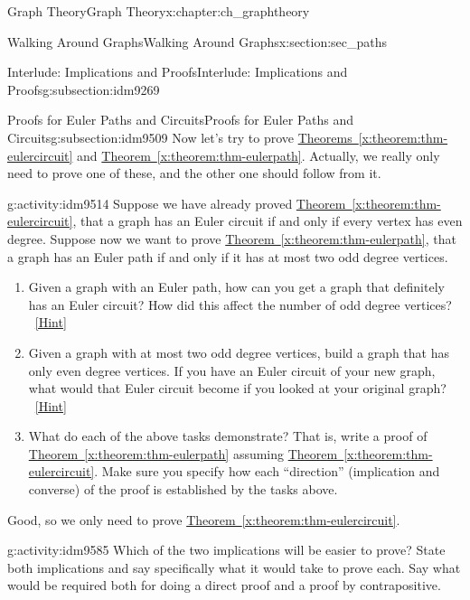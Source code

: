 \documentclass[oneside,10pt,]{book}
\numberwithin{equation}{chapter}
\begin{document}
\begin{chapterptx}{Graph Theory}{}{Graph Theory}{}{}{x:chapter:ch_graphtheory}
\begin{sectionptx}{Walking Around Graphs}{}{Walking Around Graphs}{}{}{x:section:sec_paths}
\begin{subsectionptx}{Interlude: Implications and Proofs}{}{Interlude: Implications and Proofs}{}{}{g:subsection:idm9269}
\end{subsectionptx}
%
%
\typeout{************************************************}
\typeout{************************************************}
%
\begin{subsectionptx}{Proofs for Euler Paths and Circuits}{}{Proofs for Euler Paths and Circuits}{}{}{g:subsection:idm9509}
Now let's try to prove \hyperref[x:theorem:thm-eulercircuit]{Theorems~\ref{x:theorem:thm-eulercircuit}} and \hyperref[x:theorem:thm-eulerpath]{Theorem~\ref{x:theorem:thm-eulerpath}}.  Actually, we really only need to prove one of these, and the other one should follow from it.%
\begin{activity}{}{g:activity:idm9514}%
Suppose we have already proved \hyperref[x:theorem:thm-eulercircuit]{Theorem~\ref{x:theorem:thm-eulercircuit}}, that a graph has an Euler circuit if and only if every vertex has even degree.  Suppose now we want to prove \hyperref[x:theorem:thm-eulerpath]{Theorem~\ref{x:theorem:thm-eulerpath}}, that a graph has an Euler path if and only if it has at most two odd degree vertices.%
\begin{enumerate}[font=\bfseries,label=(\alph*),ref=\alph*]
\item{}Given a graph with an Euler path, how can you get a graph that definitely has an Euler circuit?  How did this affect the number of odd degree vertices?%
\qquad~\hfill{\tiny\hyperlink{g:hint:idm9522-back}{[Hint]}}\item{}Given a graph with at most two odd degree vertices, build a graph that has only even degree vertices.  If you have an Euler circuit of your new graph, what would that Euler circuit become if you looked at your original graph?%
\qquad~\hfill{\tiny\hyperlink{g:hint:idm9546-back}{[Hint]}}\item{}What do each of the above tasks demonstrate?  That is, write a proof of \hyperref[x:theorem:thm-eulerpath]{Theorem~\ref{x:theorem:thm-eulerpath}} assuming \hyperref[x:theorem:thm-eulercircuit]{Theorem~\ref{x:theorem:thm-eulercircuit}}.  Make sure you specify how each ``direction'' (implication and converse) of the proof is established by the tasks above.%
\end{enumerate}
\end{activity}
Good, so we only need to prove \hyperref[x:theorem:thm-eulercircuit]{Theorem~\ref{x:theorem:thm-eulercircuit}}.%
\begin{activity}{}{g:activity:idm9585}%
Which of the two implications will be easier to prove?  State both implications and say specifically what it would take to prove each.  Say what would be required both for doing a direct proof and a proof by contrapositive.%

\end{activity}
\end{subsectionptx}
\end{sectionptx}
\end{chapterptx}
\end{document}
